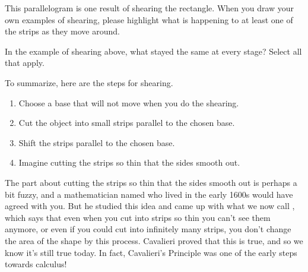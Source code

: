 \documentclass{ximera}
\begin{document}
\begin{example}
\begin{image}
\end{image}
This parallelogram is one result of shearing the rectangle. When you draw your own examples of shearing, please highlight what is happening to at least one of the strips as they move around.

\end{example}

\begin{question}
In the example of shearing above, what stayed the same at every stage? Select all that apply.
\begin{selectAll}
\end{selectAll}
\end{question}

To summarize, here are the steps for shearing.
\begin{enumerate}[label=\arabic{enumi}.]
	\item  Choose a base that will not move when you do the shearing.
	\item Cut the object into small strips parallel to the chosen base.
	\item Shift the strips parallel to the chosen base.
	\item Imagine cutting the strips so thin that the sides smooth out.
\end{enumerate}
The part about cutting the strips so thin that the sides smooth out is perhaps a bit fuzzy, and a mathematician named  who lived in the early 1600s would have agreed with you. But he studied this idea and came up with what we now call , which says that even when you cut into strips so thin you can't see them anymore, or even if you could cut into infinitely many strips, you don't change the area of the shape by this process. Cavalieri proved that this is true, and so we know it's still true today. In fact, Cavalieri's Principle was one of the early steps towards calculus!
\end{document}
